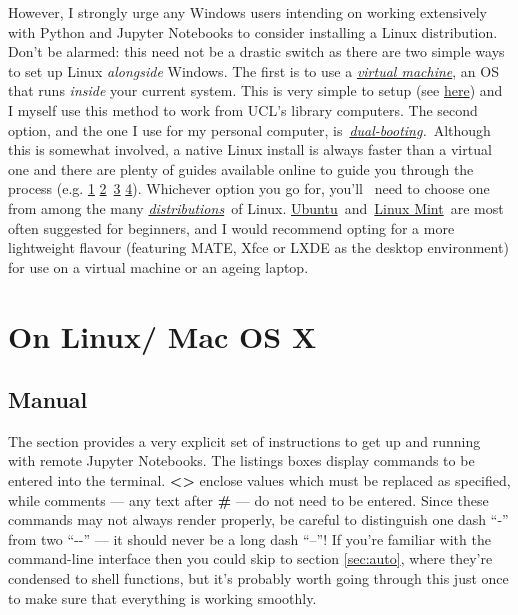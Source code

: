 \documentclass[a4paper]{article}
\begin{document}
However, I strongly urge any Windows users intending on working extensively with Python and Jupyter Notebooks to consider installing a Linux distribution.
Don't be alarmed: this need not be a drastic switch as there are two simple ways to set up Linux \emph{alongside} Windows.
The first is to use a \emph{\href{https://www.howtogeek.com/196060/beginner-geek-how-to-create-and-use-virtual-machines/}{virtual machine}}, an OS that runs \emph{inside} your current system.
This is very simple to setup (see \href{http://www.storagecraft.com/blog/the-dead-simple-guide-to-installing-a-linux-virtual-machine-on-windows/}{here}) and I myself use this method to work from UCL's library computers.
The second option, and the one I use for my personal computer, is~\emph{\href{https://www.howtogeek.com/187789/dual-booting-explained-how-you-can-have-multiple-operating-systems-on-your-computer/}{dual-booting}.}~Although this is somewhat involved, a native Linux install is always faster than a virtual one and there are plenty of guides available online to guide you through the process (e.g. \href{https://itsfoss.com/guide-install-linux-mint-16-dual-boot-windows/}{1} \href{https://www.lifewire.com/ultimate-windows-7-ubuntu-linux-dual-boot-guide-2200653}{2}~\href{https://www.howtogeek.com/214571/how-to-dual-boot-linux-on-your-pc/}{3} \href{http://www.pcworld.com/article/2955460/operating-systems/dual-booting-linux-with-windows-what-you-need-to-know.html}{4}). 
Whichever option you go for, you'll ~need to choose one from among the many \emph{\href{http://distrowatch.com/dwres.php?resource=major}{distributions}~}of Linux.
\href{https://www.ubuntu.com/download}{Ubuntu}~and~\href{https://linuxmint.com/}{Linux Mint}~are most often suggested for beginners, and I would recommend opting for a more lightweight flavour (featuring MATE, Xfce or LXDE as the desktop environment) for use on a virtual machine or an ageing laptop.

\section{On Linux/ Mac OS X}
\subsection{Manual}

The section provides a very explicit set of instructions to get up and running with remote Jupyter Notebooks.
The listings boxes display commands to be entered into the terminal. \textbf{\textless{}\textgreater{}} enclose values which must be replaced as specified, while comments --- any text after \textbf{\#} --- do not need to be entered.
Since these commands may not always render properly, be careful to distinguish one dash ``-'' from two ``-{}-'' --- it should never be a long dash ``--''!
If you're familiar with the command-line interface then you could skip to section \ref{sec:auto}, where they're condensed to shell functions, but it's probably worth going through this just once to make sure that everything is working smoothly.
\end{document}

